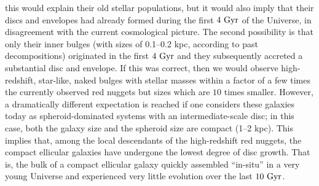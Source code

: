 \documentclass[useAMS,usenatbib,article]{mnras}
\begin{document}
this would explain their old stellar populations, 
but it would also imply that their discs and envelopes had already formed during the first $4~\rm Gyr$ of the Universe, 
in disagreement with the current cosmological picture. 
The second possibility is that only their inner bulges (with sizes of 0.1--0.2 kpc, 
according to past decompositions) originated in the first $4~\rm Gyr$ 
and they subsequently accreted a substantial disc and envelope. 
If this was correct, then we would observe high-redshift, star-like, naked bulges with stellar masses 
within a factor of a few times the currently observed red nuggets but sizes which are $10$ times smaller. 
However, a dramatically different expectation is reached 
if one considers these galaxies today as spheroid-dominated systems with an intermediate-scale disc; 
in this case, both the galaxy size and the spheroid size are compact (1--2 kpc). 
This implies that, among the local descendants of the high-redshift red nuggets, 
the compact ellicular galaxies have undergone the lowest degree of disc growth. 
That is, the bulk of a compact ellicular galaxy quickly assembled ``in-situ'' in a very young Universe 
and experienced very little evolution over the last $10~\rm Gyr$.
\end{document}

